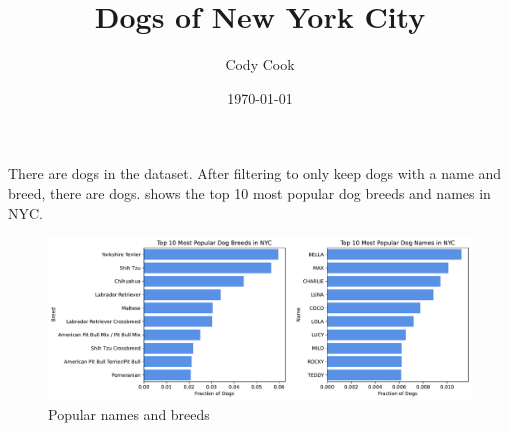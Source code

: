 \documentclass[10pt]{article}
\title{Dogs of New York City}
\author{Cody Cook}
\date{\today}
\begin{document}
\maketitle  

There are  dogs in the dataset. After filtering to only keep dogs with a name and breed, there are  dogs.  shows the top 10 most popular dog breeds and names in NYC. 

\begin{figure}[htpb]
    \caption{Popular names and breeds}
    \label{fig:top_breeds_and_names}
    \includegraphics[width=1\textwidth]{input/top_breeds_and_names.pdf}
\end{figure}
\end{document}
